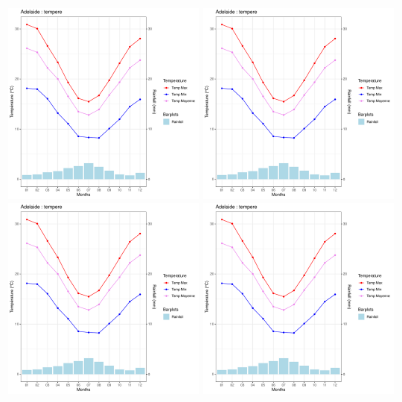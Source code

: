 \documentclass{article}
\begin{document}
\begin{figure}[H]
    \centering
    \includegraphics[page=1,width=0.45\textwidth]{Ressources/Temp_and_Rainfall.pdf}
    \includegraphics[page=11,width=0.45\textwidth]{Ressources/Temp_and_Rainfall.pdf}
    \includegraphics[page=14,width=0.45\textwidth]{Ressources/Temp_and_Rainfall.pdf}
    \includegraphics[page=49,width=0.45\textwidth]{Ressources/Temp_and_Rainfall.pdf}

\end{figure}
\end{document}
